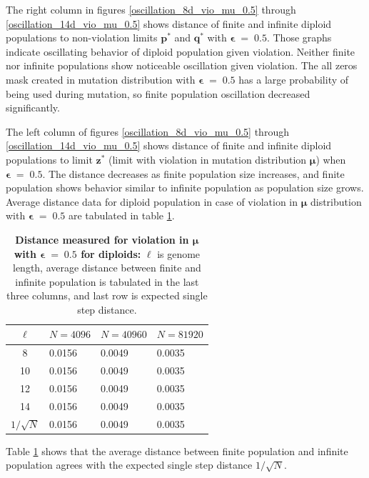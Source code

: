 \clearpage

The right column in figures \ref{oscillation_8d_vio_mu_0.5} through \ref{oscillation_14d_vio_mu_0.5} 
shows distance of finite and infinite diploid populations to non-violation limits $\bm{p^\ast}$ and $\bm{q^\ast}$ with $\bm{\epsilon} \;=\; 0.5$. 
Those graphs indicate oscillating behavior of diploid population given violation. 
Neither finite nor infinite populations show noticeable oscillation given violation. 
The all zeros mask created in mutation distribution with $\bm{\epsilon} \;=\; 0.5$ has a large probability 
of being used during mutation, so finite population oscillation decreased significantly.

The left column of figures \ref{oscillation_8d_vio_mu_0.5} through \ref{oscillation_14d_vio_mu_0.5} 
shows distance of finite and infinite diploid populations to limit $\bm{z^\ast}$ 
(limit with violation in mutation distribution $\bm{\mu}$) when $\bm{\epsilon} \;=\; 0.5$. 
The distance decreases as finite population size increases, 
and finite population shows behavior similar to infinite population as population size grows. 
Average distance data for diploid population in case of violation in $\bm{\mu}$ distribution 
with $\bm{\epsilon} \;=\; 0.5$ are tabulated in table \ref{distanceMuDipEps0.5}.

\begin{table}[ht]
\caption[\textbf{Distance measured for violation in $\bm{\mu}$ with $\bm{\epsilon} \;=\; 0.5$ for diploids}]{\textbf{Distance measured for violation in $\bm{\mu}$ with $\bm{\epsilon} \;=\; 0.5$ for diploids:} $\ell$ is genome length, 
average distance between finite and infinite population is tabulated in the last three columns, and last row is expected single step distance.}
\centering
\begin{tabularx}{0.75\textwidth}{ c *{3}{X}}
\toprule
$\ell$ & $N = 4096$ & $N = 40960$ & $N = 81920$ \\
\midrule
8 & 0.0156	&  0.0049	& 0.0035 \\	
10 & 0.0156	&  0.0049 	& 0.0035 \\
12 & 0.0156	&  0.0049	& 0.0035 \\
14 & 0.0156	&  0.0049	& 0.0035 \\
\midrule
$1/\sqrt{N}$ & 0.0156 & 0.0049 & 0.0035 \\
\bottomrule
\end{tabularx}
\label{distanceMuDipEps0.5}
\end{table}

Table \ref{distanceMuDipEps0.5} shows that the average distance between 
finite population and infinite population agrees with the expected single step distance $1/\sqrt{N}$.  
